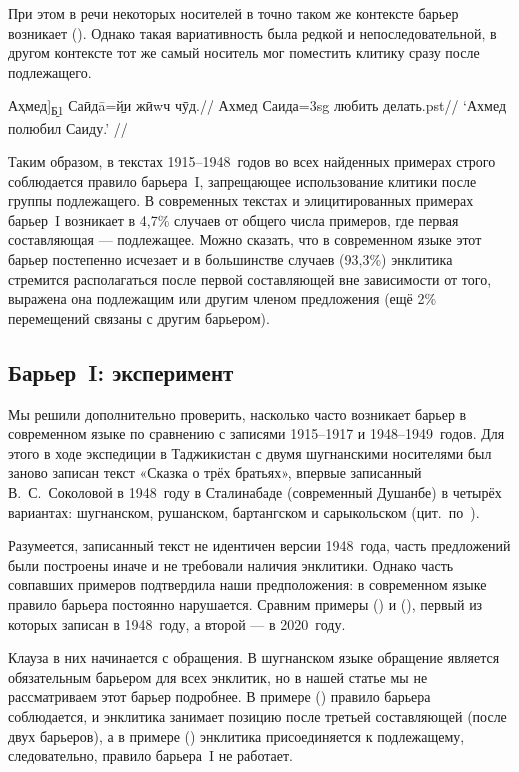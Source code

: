 При этом в речи некоторых носителей в точно таком же контексте барьер возникает (). Однако такая вариативность была редкой и непоследовательной, в другом контексте тот же самый носитель мог поместить клитику сразу после подлежащего.

\begingl
\gla {[}Аҳмед{]}\textsubscript{\b{Б1}} Саӣдā=\b{йи} жӣwч чӯд.//
\glc Ахмед Саида={\sc 3sg} любить делать.{\sc pst}//
\glft ‘Ахмед полюбил Саиду.’ \trailingcitation{[элицитация, 2019]}//
\endgl \xe

Таким образом, в текстах 1915–1948~годов во всех найденных примерах строго соблюдается правило барьера~I, запрещающее использование клитики после группы подлежащего. В современных текстах и элицитированных примерах барьер~I возникает в 4,7\% случаев от общего числа примеров, где первая составляющая — подлежащее. Можно сказать, что в современном языке этот барьер постепенно исчезает и в большинстве случаев (93,3\%) энклитика стремится располагаться после первой составляющей вне зависимости от того, выражена она подлежащим или другим членом предложения (ещё 2\% перемещений связаны с другим барьером).

\subsection{Барьер~I: эксперимент} \label{clit-barone-exp}

Мы решили дополнительно проверить, насколько часто возникает барьер в современном языке по сравнению с записями 1915–1917 и 1948–1949~годов. Для этого в ходе экспедиции в Таджикистан с двумя шугнанскими носителями был заново записан текст «Сказка о трёх братьях», впервые записанный В.~С.~Соколовой в 1948~году в Сталинабаде (современный Душанбе) в четырёх вариантах: шугнанском, рушанском, бартангском и сарыкольском (цит.~по~\parencite{pakhalina1969_pamir}).

Разумеется, записанный текст не идентичен версии 1948~года, часть предложений были построены иначе и не требовали наличия энклитики. Однако часть совпавших примеров подтвердила наши предположения: в современном языке правило барьера постоянно нарушается. Сравним примеры () и (), первый из которых записан в 1948~году, а второй — в 2020~году.

Клауза в них начинается с обращения. В шугнанском языке обращение является обязательным барьером для всех энклитик, но в нашей статье мы не рассматриваем этот барьер подробнее. В примере () правило барьера соблюдается, и энклитика занимает позицию после третьей составляющей (после двух барьеров), а в примере () энклитика присоединяется к подлежащему, следовательно, правило барьера~I не работает.

